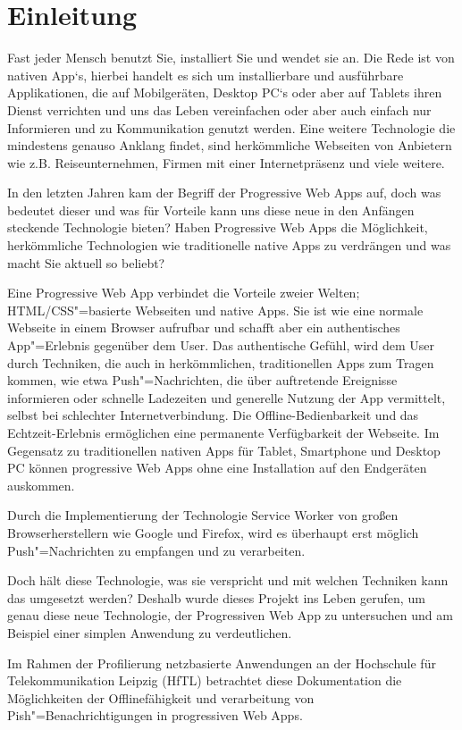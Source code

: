 \chapter{Einleitung}

Fast jeder Mensch benutzt Sie, installiert Sie und wendet sie an. Die Rede ist von nativen App`s, hierbei handelt es sich um installierbare und ausführbare Applikationen, die auf Mobilgeräten, Desktop PC`s oder aber auf Tablets ihren Dienst verrichten und uns das Leben vereinfachen oder aber auch einfach nur Informieren und zu Kommunikation genutzt werden. Eine weitere Technologie die mindestens genauso Anklang findet, sind herkömmliche Webseiten von Anbietern wie z.B. Reiseunternehmen, Firmen mit einer Internetpräsenz und viele weitere.

In den letzten Jahren kam der Begriff der \glqq Progressive Web Apps\grqq{} auf, doch was bedeutet dieser und was für Vorteile kann uns diese neue in den Anfängen steckende Technologie bieten? Haben \glqq Progressive Web Apps\grqq{} die Möglichkeit, herkömmliche Technologien wie traditionelle native Apps zu verdrängen und was macht Sie aktuell so beliebt?

Eine Progressive Web App verbindet die Vorteile zweier Welten; HTML/CSS"=basierte Webseiten und native Apps. Sie ist wie eine normale Webseite in einem Browser aufrufbar und schafft aber ein authentisches App"=Erlebnis gegenüber dem User. Das authentische Gefühl, wird dem User durch Techniken, die auch in herkömmlichen, traditionellen Apps zum Tragen kommen, wie etwa Push"=Nachrichten, die über auftretende Ereignisse informieren oder schnelle Ladezeiten und generelle Nutzung der App vermittelt, selbst bei schlechter Internetverbindung. Die Offline-Bedienbarkeit und das Echtzeit-Erlebnis ermöglichen eine permanente Verfügbarkeit der Webseite.  
Im Gegensatz zu traditionellen nativen Apps für Tablet, Smartphone und Desktop PC können progressive Web Apps ohne eine Installation auf den Endgeräten auskommen. 

Durch die Implementierung der Technologie \glqq Service Worker\grqq{} von großen Browserherstellern wie Google und Firefox, wird es überhaupt erst möglich Push"=Nachrichten zu empfangen und zu verarbeiten.

Doch hält diese Technologie, was sie verspricht und mit welchen Techniken kann das umgesetzt werden? Deshalb wurde dieses Projekt ins Leben gerufen, um genau diese neue Technologie, der \glqq Progressiven Web App\grqq{} zu untersuchen und am Beispiel einer simplen Anwendung zu verdeutlichen.

Im Rahmen der Profilierung \glqq netzbasierte Anwendungen\grqq{} an der Hochschule für Telekommunikation Leipzig (HfTL) betrachtet diese Dokumentation die Möglichkeiten der Offlinefähigkeit und verarbeitung von Pish"=Benachrichtigungen in progressiven Web Apps.
